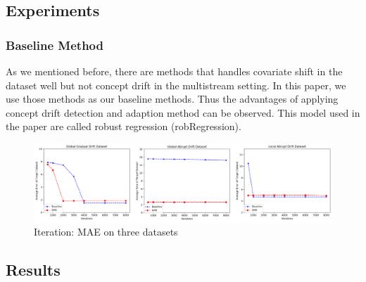 \subsection{Experiments}



\subsubsection{Baseline Method}

As we mentioned before, there are methods that handles covariate shift in the
dataset well but not concept drift in the multistream setting.
In this paper, we use those methods as our baseline methods. Thus the advantages of applying concept drift detection and adaption method can be observed. This model used in the paper are called robust regression (robRegression).

\begin{figure}
\centering
\includegraphics{fig_iterationview.eps}
\caption{Iteration: MAE on three datasets}
\label{fig:iterationview}
\end{figure}

\subsection{Results}

\newenvironment{figurehere}
{\def\@captype{table}}
{}



